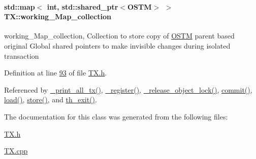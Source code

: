 \paragraph[{\texorpdfstring{working\+\_\+\+Map\+\_\+collection}{working_Map_collection}}]{\setlength{\rightskip}{0pt plus 5cm}std\+::map$<$ int, std\+::shared\+\_\+ptr$<${\bf O\+S\+TM}$>$ $>$ T\+X\+::working\+\_\+\+Map\+\_\+collection\hspace{0.3cm}{\ttfamily [private]}}\hypertarget{class_t_x_a81aafda16e2f20e36ec6c68e584668ff_a81aafda16e2f20e36ec6c68e584668ff}{}\label{class_t_x_a81aafda16e2f20e36ec6c68e584668ff_a81aafda16e2f20e36ec6c68e584668ff}
working\+\_\+\+Map\+\_\+collection, Collection to store copy of \hyperlink{class_o_s_t_m}{O\+S\+TM} parent based original Global shared pointers to make invisible changes during isolated transaction 

Definition at line \hyperlink{_t_x_8h_source_l00093}{93} of file \hyperlink{_t_x_8h_source}{T\+X.\+h}.



Referenced by \hyperlink{_t_x_8cpp_source_l00311}{\+\_\+print\+\_\+all\+\_\+tx()}, \hyperlink{_t_x_8cpp_source_l00096}{\+\_\+register()}, \hyperlink{_t_x_8cpp_source_l00253}{\+\_\+release\+\_\+object\+\_\+lock()}, \hyperlink{_t_x_8cpp_source_l00177}{commit()}, \hyperlink{_t_x_8cpp_source_l00137}{load()}, \hyperlink{_t_x_8cpp_source_l00157}{store()}, and \hyperlink{_t_x_8cpp_source_l00052}{th\+\_\+exit()}.



The documentation for this class was generated from the following files\+:\begin{DoxyCompactItemize}
\item 
\hyperlink{_t_x_8h}{T\+X.\+h}\item 
\hyperlink{_t_x_8cpp}{T\+X.\+cpp}\end{DoxyCompactItemize}
